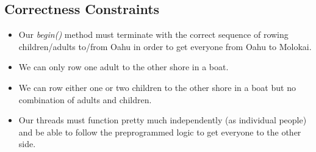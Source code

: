 \documentclass{article}
\begin{document}
\subsection*{Correctness Constraints}
\begin{itemize}
\item Our \textit{begin()} method must terminate with the correct sequence of rowing children/adults to/from Oahu
in order to get everyone from Oahu to Molokai.
\item We can only row one adult to the other shore in a boat.
\item We can row either one or two children to the other shore in a boat but no combination of adults and children.
\item Our threads must function pretty much independently (as individual people) and be able to follow the preprogrammed
logic to get everyone to the other side.
\end{itemize}
\end{document}
